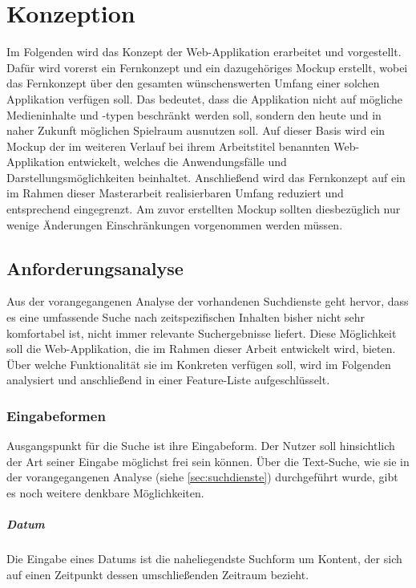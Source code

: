 \chapter{Konzeption}
\label{cha:konzeption}
Im Folgenden wird das Konzept der Web-Applikation erarbeitet und vorgestellt. Dafür wird vorerst ein Fernkonzept und ein dazugehöriges Mockup erstellt, wobei das Fernkonzept über den gesamten wünschenswerten Umfang einer solchen Applikation verfügen soll.  Das bedeutet, dass die Applikation nicht auf mögliche Medieninhalte und -typen beschränkt werden soll, sondern den heute und in naher Zukunft möglichen Spielraum ausnutzen soll.
Auf dieser Basis wird ein Mockup der im weiteren Verlauf bei ihrem Arbeitstitel \textbf{\arbeitstitel} benannten Web-Applikation entwickelt, welches die Anwendungsfälle und Darstellungsmöglichkeiten beinhaltet.
Anschließend wird das Fernkonzept auf ein im Rahmen dieser Masterarbeit realisierbaren Umfang reduziert und entsprechend eingegrenzt. Am zuvor erstellten Mockup sollten diesbezüglich nur wenige Änderungen \bzw Einschränkungen vorgenommen werden müssen.

\section{Anforderungsanalyse}
Aus der vorangegangenen Analyse der vorhandenen Suchdienste geht hervor, dass es eine umfassende Suche nach zeitspezifischen Inhalten bisher nicht sehr komfortabel ist, \bzw nicht immer relevante Suchergebnisse liefert. Diese Möglichkeit soll die Web-Applikation, die im Rahmen dieser Arbeit entwickelt wird, bieten. Über welche Funktionalität sie im Konkreten verfügen soll, wird im Folgenden analysiert und anschließend in einer Feature-Liste aufgeschlüsselt.

\subsection{Eingabeformen}
Ausgangspunkt für die Suche ist ihre Eingabeform. Der Nutzer soll hinsichtlich der Art seiner Eingabe möglichst frei sein können. Über die Text-Suche, wie sie in der vorangegangenen Analyse (siehe \ref{sec:suchdienste}) durchgeführt wurde, gibt es noch weitere denkbare Möglichkeiten.

\paragraph{Datum}
Die Eingabe eines Datums ist die naheliegendste Suchform um Kontent, der sich auf einen Zeitpunkt \bzw dessen umschließenden Zeitraum bezieht.


